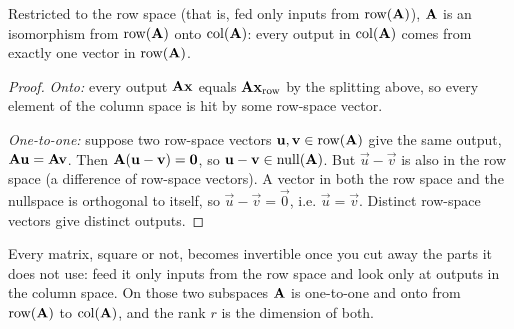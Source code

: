 \begin{theorem}\label{ch15:iso-thm}
Restricted to the row space (that is, fed only inputs from $\operatorname{row}(\mathbf{A})$), $\mathbf{A}$ is an
isomorphism from $\operatorname{row}(\mathbf{A})$ onto
$\operatorname{col}(\mathbf{A})$: every output in $\operatorname{col}(\mathbf{A})$ comes from exactly one vector in $\operatorname{row}(\mathbf{A})$.
\end{theorem}

\begin{proof}
\emph{Onto:} every output $\mathbf{A}\mathbf{x}$ equals $\mathbf{A}\mathbf{x}_{\text{row}}$ by the splitting
above, so every element of the column space is hit by some row-space vector.

\emph{One-to-one:} suppose two row-space vectors $\mathbf{u},\mathbf{v}\in\operatorname{row}(\mathbf{A})$ give the same
output, $\mathbf{A}\mathbf{u}=\mathbf{A}\mathbf{v}$. Then $\mathbf{A}(\mathbf{u}-\mathbf{v})=\mathbf{0}$, so
$\mathbf{u}-\mathbf{v}\in\operatorname{null}(\mathbf{A})$. But $\vec{u}-\vec{v}$ is also in the row space (a difference
of row-space vectors). A vector in both the row space and the nullspace is orthogonal to itself,
so $\vec{u}-\vec{v}=\vec{0}$, i.e. $\vec{u}=\vec{v}$. Distinct row-space vectors give distinct
outputs.
\end{proof}

\begin{focusbox}
Every matrix, square or not, becomes invertible once you cut away the parts it does not use:
feed it only inputs from the row space and look only at outputs in the column space. On those
two subspaces $\mathbf{A}$ is one-to-one and onto from $\operatorname{row}(\mathbf{A})$ to $\operatorname{col}(\mathbf{A})$, and the
rank $r$ is the dimension of both.
\end{focusbox}

